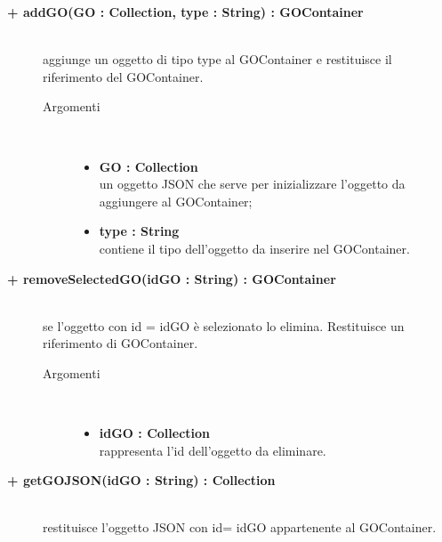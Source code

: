 \begin{description}
\begin{description}
		\item[\textbf{\color{blue}+ addGO(GO : Collection, type : String) : GOContainer			}] \hfill \\
			aggiunge un oggetto di tipo type al GOContainer e restituisce il riferimento del GOContainer.  

\begin{description}
			\item[Argomenti] \hfill \\
				\begin{itemize}
						\item \textbf{GO : Collection			} \hfill \\
					un oggetto JSON che serve per inizializzare l'oggetto da aggiungere al GOContainer;
					  	\item \textbf{type : String			} \hfill \\
					  	contiene il tipo dell'oggetto da inserire nel GOContainer.
				\end{itemize}

\end{description}

\end{description}

\begin{description}
		\item[\textbf{\color{blue}+ removeSelectedGO(idGO : String) : GOContainer			}] \hfill \\
			se l'oggetto con id = idGO è selezionato lo elimina. Restituisce un riferimento di GOContainer. 

\begin{description}
			\item[Argomenti] \hfill \\
				\begin{itemize}
						\item \textbf{idGO : Collection			} \hfill \\
					rappresenta l'id dell'oggetto da eliminare.
				\end{itemize}

\end{description}

\end{description}


\begin{description}
		\item[\textbf{\color{blue}+ getGOJSON(idGO : String) : Collection			}] \hfill \\
			restituisce l'oggetto JSON con id= idGO appartenente al GOContainer.   


\end{description}
\end{description}
